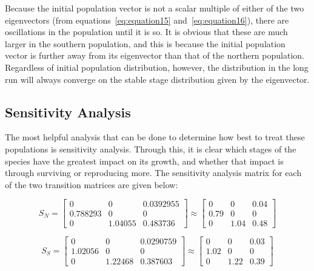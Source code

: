 \documentclass{article}
\begin{document}
    Because the initial population vector is not a scalar multiple of either of the two eigenvectors (from equations~\ref{eq:equation15} and~\ref{eq:equation16}), there are oscillations in the population until it is so.
    It is obvious that these are much larger in the southern population, and this is because the initial population vector is further away from its eigenvector than that of the northern population.
    Regardless of initial population distribution, however, the distribution in the long run will always converge on the stable stage distribution given by the eigenvector.

    \subsection{Sensitivity Analysis}\label{subsec:sensitivity-analysis}

    The most helpful analysis that can be done to determine how best to treat these populations is sensitivity analysis.
    Through this, it is clear which stages of the species have the greatest impact on its growth, and whether that impact is through surviving or reproducing more.
    The sensitivity analysis matrix for each of the two transition matrices are given below:

    \begin{equation}
        S_N = \begin{bmatrix}
                  0 & 0 & 0.0392955 \\
                  0.788293 & 0   & 0   \\
                  0   & 1.04055 & 0.483736
        \end{bmatrix} \approx
        \begin{bmatrix}
            0 & 0 & 0.04 \\
            0.79 & 0   & 0   \\
            0   & 1.04 & 0.48
        \end{bmatrix}
    \end{equation}

    \begin{equation}
        S_S = \begin{bmatrix}
                  0 & 0 & 0.0290759 \\
                  1.02056 & 0   & 0   \\
                  0   & 1.22468 & 0.387603
        \end{bmatrix} \approx
        \begin{bmatrix}
            0 & 0 & 0.03 \\
            1.02 & 0   & 0   \\
            0 & 1.22 & 0.39
        \end{bmatrix}
    \end{equation}
\end{document}
